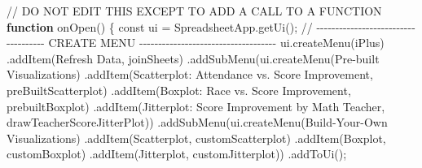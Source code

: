 \documentclass[
  letterpaper,
  DIV=11,
  numbers=noendperiod]{scrartcl}
\newenvironment{Shaded}{\begin{snugshade}}{\end{snugshade}}
\newcommand{\ControlFlowTok}[1]{\textcolor[rgb]{0.00,0.23,0.31}{\textbf{#1}}}
\newcommand{\ErrorTok}[1]{\textcolor[rgb]{0.68,0.00,0.00}{#1}}
\newcommand{\FunctionTok}[1]{\textcolor[rgb]{0.28,0.35,0.67}{#1}}
\newcommand{\NormalTok}[1]{\textcolor[rgb]{0.00,0.23,0.31}{#1}}
\newcommand{\OtherTok}[1]{\textcolor[rgb]{0.00,0.23,0.31}{#1}}
\newcommand{\SpecialCharTok}[1]{\textcolor[rgb]{0.37,0.37,0.37}{#1}}
\newcommand{\StringTok}[1]{\textcolor[rgb]{0.13,0.47,0.30}{#1}}
\begin{document}
\begin{Shaded}
\begin{Highlighting}[]
\SpecialCharTok{/}\ErrorTok{/}\NormalTok{ DO NOT EDIT THIS EXCEPT TO ADD A CALL TO A FUNCTION}
\ControlFlowTok{function} \FunctionTok{onOpen}\NormalTok{() \{}
\NormalTok{  const ui }\OtherTok{=} \FunctionTok{SpreadsheetApp.getUi}\NormalTok{(); }
  \SpecialCharTok{/}\ErrorTok{/} \SpecialCharTok{{-}{-}{-}{-}{-}{-}{-}{-}{-}{-}{-}{-}{-}{-}{-}{-}{-}{-}{-}{-}{-}{-}{-}{-}{-}{-}{-}{-}{-}{-}{-}{-}{-}{-}{-}{-}}\NormalTok{ CREATE MENU }\SpecialCharTok{{-}{-}{-}{-}{-}{-}{-}{-}{-}{-}{-}{-}{-}{-}{-}{-}{-}{-}{-}{-}{-}{-}{-}{-}{-}{-}{-}{-}{-}{-}{-}{-}{-}{-}{-}{-}}
  \FunctionTok{ui.createMenu}\NormalTok{(}\StringTok{\textquotesingle{}iPlus\textquotesingle{}}\NormalTok{)}
    \FunctionTok{.addItem}\NormalTok{(}\StringTok{\textquotesingle{}Refresh Data\textquotesingle{}}\NormalTok{, }\StringTok{\textquotesingle{}joinSheets\textquotesingle{}}\NormalTok{)}
    \FunctionTok{.addSubMenu}\NormalTok{(}\FunctionTok{ui.createMenu}\NormalTok{(}\StringTok{\textquotesingle{}Pre{-}built Visualizations\textquotesingle{}}\NormalTok{)}
          \FunctionTok{.addItem}\NormalTok{(}\StringTok{\textquotesingle{}Scatterplot: Attendance vs. Score Improvement\textquotesingle{}}\NormalTok{, }\StringTok{\textquotesingle{}preBuiltScatterplot\textquotesingle{}}\NormalTok{)}
          \FunctionTok{.addItem}\NormalTok{(}\StringTok{\textquotesingle{}Boxplot: Race vs. Score Improvement\textquotesingle{}}\NormalTok{, }\StringTok{\textquotesingle{}prebuiltBoxplot\textquotesingle{}}\NormalTok{)}
          \FunctionTok{.addItem}\NormalTok{(}\StringTok{\textquotesingle{}Jitterplot: Score Improvement by Math Teacher\textquotesingle{}}\NormalTok{, }\StringTok{\textquotesingle{}drawTeacherScoreJitterPlot\textquotesingle{}}\NormalTok{))}
    \FunctionTok{.addSubMenu}\NormalTok{(}\FunctionTok{ui.createMenu}\NormalTok{(}\StringTok{\textquotesingle{}Build{-}Your{-}Own Visualizations\textquotesingle{}}\NormalTok{)}
          \FunctionTok{.addItem}\NormalTok{(}\StringTok{\textquotesingle{}Scatterplot\textquotesingle{}}\NormalTok{, }\StringTok{\textquotesingle{}customScatterplot\textquotesingle{}}\NormalTok{)}
          \FunctionTok{.addItem}\NormalTok{(}\StringTok{\textquotesingle{}Boxplot\textquotesingle{}}\NormalTok{, }\StringTok{\textquotesingle{}customBoxplot\textquotesingle{}}\NormalTok{)}
          \FunctionTok{.addItem}\NormalTok{(}\StringTok{\textquotesingle{}Jitterplot\textquotesingle{}}\NormalTok{, }\StringTok{\textquotesingle{}customJitterplot\textquotesingle{}}\NormalTok{))}
    \FunctionTok{.addToUi}\NormalTok{();}


\end{Highlighting}
\end{Shaded}
\end{document}
